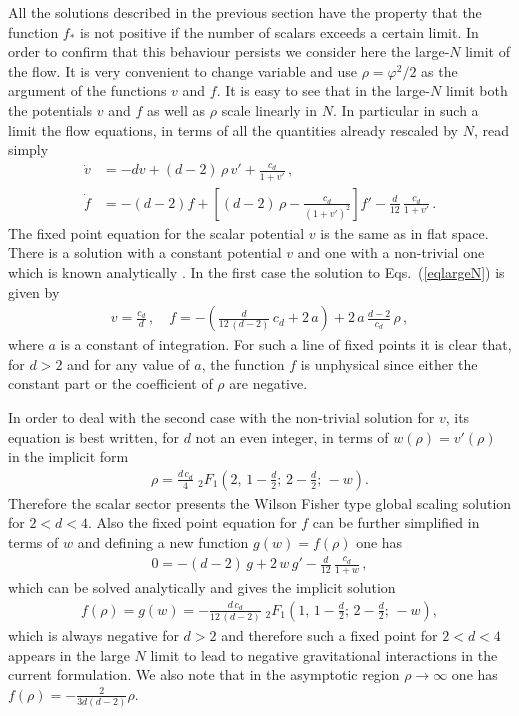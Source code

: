 \documentclass[11pt]{book} %
\begin{document}
All the solutions described in the previous section
have the property that the function $f_*$ is not
positive if the number of scalars exceeds a certain limit.
In order to confirm that this behaviour persists
we consider here the large-$N$ limit of the flow.
It is very convenient to change variable and use $\rho=\varphi^2/2$
as the argument of the functions $v$ and $f$.
It is easy to see that in the large-$N$ limit both the potentials $v$ and $f$ as well
as $\rho$ scale linearly in $N$.
In particular in such a limit the flow equations,
in terms of all the quantities already rescaled by $N$, read simply
\begin{align}
  \dot v &= - d v    + (d-2) \, \rho \, v' + \frac{c_d}{1+v'} \,, \\
  \dot f &= -(d-2) f + \left[ (d-2) \, \rho - \frac{c_d}{\left(1+v'\right)^2} \right] f'  - \frac{d}{12} \, \frac{c_d} {1+v'} \,.
  \label{eqlargeN}
\end{align}
The fixed point equation for the scalar potential $v$ is the same as in flat space.
There is a solution with a constant potential $v$ and one with a non-trivial one which
is known analytically \cite{Marchais:2012}.
In the first case the solution to Eqs.~(\ref{eqlargeN}) is given by
\begin{align}
  v = \frac{c_d}{d} \,, \quad
  f = -\left( \frac{d}{12 \, (d-2)} \, c_d + 2 \, a\right) +  2 \, a \, \frac{d-2}{c_d} \, \rho \,,
\end{align}
where $a$ is a constant of integration. For such a line of fixed points it is clear that,
for $d>2$  and for any value of $a$, the function $f$ is unphysical since either the constant
part or the coefficient of $\rho$ are negative.

In order to deal with the  second case with the non-trivial solution for $v$, its equation is best written,
for $d$ not an even integer, in terms of $w(\rho)=v'(\rho)$ in the implicit form
\begin{align}
  \rho = \frac{d \, c_d}{4} \; _2F_1 \left( 2,\, 1 - \frac{d}{2};\, 2 - \frac{d}{2};\, -w \right) .
\end{align}
Therefore the scalar sector presents the Wilson Fisher type global scaling solution for $2<d<4$.
Also the fixed point equation for $f$ can be further simplified in terms of $w$
and defining a new function $g(w)=f(\rho)$ one has
\begin{align}
  0 = -(d-2) \, g + 2 \, w \, g' - \frac{d}{12} \, \frac{c_d}{1+w} \,,
\end{align}
which can be solved analytically and gives the implicit solution
\begin{align}
  f(\rho) = g(w) = - \frac{d \, c_d}{12 \, (d-2)} \; _2F_1\left( 1,\, 1 - \frac{d}{2};\, 2 - \frac{d}{2};\, -w \right) ,
\end{align}
which is always negative for $d>2$ and therefore such a fixed point for $2<d<4$ appears
in the large $N$ limit to lead to negative gravitational interactions in the current formulation.
We also note that in the asymptotic region $\rho\to\infty$ one has $f(\rho)= -\frac{2 }{3 d (d-2) } \rho$.
\end{document}
